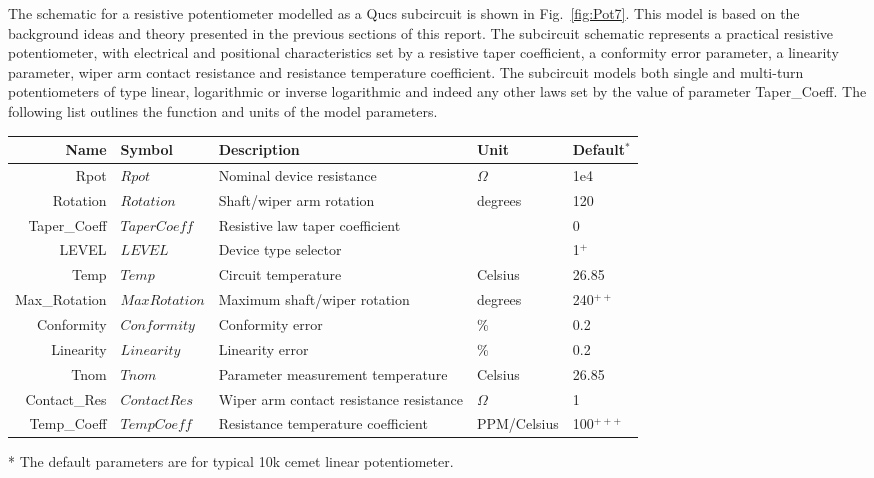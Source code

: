 The schematic for a resistive potentiometer modelled as a Qucs
subcircuit is shown in Fig.~\ref{fig:Pot7}. This model is based on the
background ideas and theory presented in the previous sections of this
report. The subcircuit schematic represents a practical resistive
potentiometer, with electrical and positional characteristics set by a
resistive taper coefficient, a conformity error parameter, a linearity
parameter, wiper arm contact resistance and resistance temperature
coefficient. The subcircuit models both single and multi-turn
potentiometers of type linear, logarithmic or inverse logarithmic and
indeed any other laws set by the value of parameter Taper\_Coeff.  The
following list outlines the function and units of the model
parameters.


\begin{longtable}{rllll}
Name & Symbol & Description & Unit & Default$^{*}$\\
\hline
\endhead
Rpot & $Rpot$ & Nominal device resistance & $\Omega$ & 1e4\\
Rotation & $Rotation$ & Shaft/wiper arm rotation & degrees & 120\\
Taper\_Coeff & $TaperCoeff$ & \parbox[t]{5.5cm}{Resistive law taper coefficient} & & 0\\
LEVEL & $LEVEL$ & Device type selector &  & 1$^+$\\
Temp& $Temp$ & Circuit temperature & Celsius  & 26.85\\
Max\_Rotation & $MaxRotation$ & \parbox[t]{5.5cm}{Maximum shaft/wiper rotation} & degrees  & 240$^{++}$\\
Conformity & $Conformity$ & Conformity error & \% & 0.2\\
Linearity & $Linearity$ & Linearity error & \% & 0.2\\
Tnom & $Tnom$ & \parbox[t]{5.5cm}{Parameter measurement temperature} & Celsius & 26.85\\
Contact\_Res & $ContactRes$ & \parbox[t]{5.5cm}{Wiper arm contact resistance resistance}  & $\Omega$ & 1\\
Temp\_Coeff & $TempCoeff$ & \parbox[t]{5.5cm}{Resistance temperature coefficient} & PPM/Celsius & 100$^{+++}$ \\
\end{longtable}

*  The default parameters are for typical 10k cemet linear potentiometer.  

